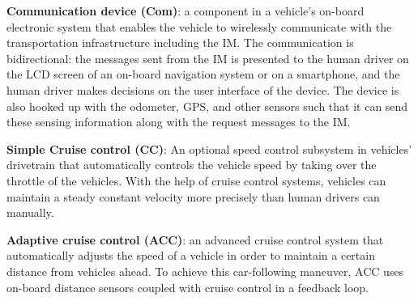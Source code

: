 \begin{small_ind_s_itemize}

\item \textbf{Communication device (Com)}:
a component in a vehicle's on-board electronic system that enables the
vehicle to wirelessly communicate with the transportation
infrastructure including the IM\@.  The communication is bidirectional:
the messages sent from the IM is presented to the human driver on
the LCD screen of an on-board navigation system or on a smartphone, and
the human driver makes decisions on the user interface of the device.
The device is also hooked up with the odometer, GPS, and other sensors
such that it can send these sensing information along with the request
messages to the IM.

\item \textbf{Simple Cruise control (CC)}:
An optional speed control subsystem in vehicles' drivetrain that
automatically controls the vehicle speed by taking over the throttle
of the vehicles.  With the help of cruise control systems, vehicles
can maintain a steady constant velocity more precisely than human
drivers can manually.

\item \textbf{Adaptive cruise control (ACC)}:
an advanced cruise control system that automatically adjusts the speed
of a vehicle in order to maintain a certain distance from vehicles
ahead. To achieve this car-following maneuver,
ACC uses on-board distance sensors coupled with cruise control
in a feedback loop.









\end{small_ind_s_itemize}

